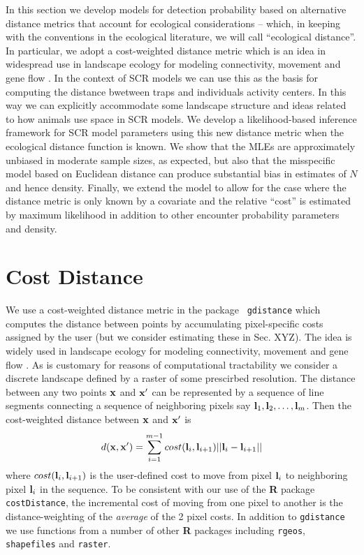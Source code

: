 In this section we develop models for detection probability based on
alternative distance metrics that account for ecological
considerations -- which, in keeping with the conventions in the ecological literature,
 we will call ``ecological distance''. In
particular, we adopt a cost-weighted distance metric which is an idea
in widespread use in 
landscape ecology for modeling connectivity, movement and gene flow
\citep{adriaensen_etal:2003,manel_etal:2003,mcrae_etal:2008}. In the context of SCR
models we can use this as the basis for computing the distance
bwetween traps and individuals activity centers. In this way we can
explicitly accommodate some landscape structure and ideas related to how animals
use space in SCR models. We develop a likelihood-based inference framework for SCR model parameters
using this new distance metric when the ecological distance function is known.  
We show that the MLEs are approximately unbiased in moderate sample
sizes, as expected, but also that the misspecific model based on Euclidean distance can produce
substantial bias in estimates of $N$ and hence density.
Finally, we extend the model to allow for the case where the distance metric is only known by a 
covariate and the relative ``cost'' is estimated by maximum likelihood in addition to other
encounter probability parameters and density. 



\section{Cost Distance}

We use a cost-weighted distance metric in the package \mbox{\tt
gdistance}  which computes the distance 
between points by accumulating pixel-specific costs assigned by the user 
(but we consider estimating these in Sec. XYZ). The idea is widely used in
landscape ecology for modeling connectivity, movement and gene flow
\citep{adriaensen_etal:2003,mcrae_etal:2008}. As is customary for reasons of
computational tractability we consider a discrete landscape defined by a 
raster of some prescirbed resolution. The distance between any two points 
${\bf x}$ and ${\bf x}'$ can be represented by a sequence of line segments 
connecting a sequence of neighboring  pixels say 
${\bf l}_{1},{\bf l}_{2},\ldots,{\bf l}_{m}$. Then the cost-weighted distance 
between ${\bf x}$ and ${\bf x}'$ is
\[
 d({\bf x},{\bf x}')
  =  \sum_{i=1}^{m-1} cost({\bf l}_{i},{\bf l}_{i+1})||{\bf l}_{i} - {\bf l}_{i+1}||
\]
where $cost({\bf l}_{i},{\bf l}_{i+1})$ is the user-defined cost to move 
from pixel ${\bf l}_{i}$ to neighboring pixel ${\bf l}_{i}$ in the sequence.
To be consistent with our use of the {\bf R} package \mbox{\tt costDistance},
the incremental cost of moving from one pixel to another is the
distance-weighting of the {\it average} of the 2 pixel costs.
In addition to \mbox{\tt gdistance} we use functions from a number of
other {\bf R} packages including \mbox{\tt rgeos}, \mbox{\tt
  shapefiles} and \mbox{\tt raster}.

